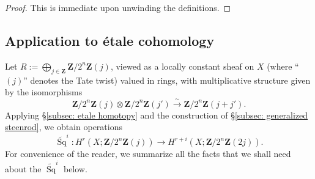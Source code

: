\documentclass[10pt, reqno]{amsart}
\numberwithin{equation}{subsection}
\newcommand{\wt}[1]{\widetilde{#1}}
\newcommand{\Z}{\mathbf{Z}}
\newcommand{\co}{\colon}
\DeclareMathOperator{\et}{\acute{e}t}
\DeclareMathOperator{\Sq}{Sq}
\DeclareMathOperator{\red}{red}
\theoremstyle{remark}
\newtheorem{remark}[thm]{Remark}
\begin{document}
\begin{proof}
This is immediate upon unwinding the definitions. 
\end{proof}

\begin{comment}
\begin{remark}
More generally, if 
\[
0 \rightarrow R/2^n R \rightarrow R/2^{n+1} R \rightarrow R/2R \rightarrow 0
\]
is short exact, then we can construct additional Steenrod operations in the following way. Given any admissible sequence $\Sq^I = \Sq^{i_1} \Sq^{i_2} \ldots$, if $i_1$ is even then we can define Steenrod operations $\wt{\Sq}^I = [2^{n-1} ] \circ \Sq^I \circ \red_2$ and $\beta_{2,2^n} \circ \Sq^I \circ \red_2$ on $H^*(X; R/2^n R)$.

If $R = \Z$ and $n>1$, then in addition to the identity map on $H (\Z/2^n\Z)$ these operations comprise the entire Steenrod algebra of stable cohomology operations with $\Z/2^n\Z$-coefficients 
\[
H^*(-;\Z/2^n \Z) \rightarrow H^*(-; \Z/2^n \Z),
\]
or in other words the spectrum maps $H (\Z/2^n\Z) \rightarrow H (\Z/2^n\Z)$. This can be proved\footnote{We thank Soren Galatius for teaching this argument to us.} by calculating $H^*(H (\Z/2^n\Z); \Z/2^n \Z)$ using the description of the Bockstein spectral sequence in \cite{Browd61} \S 5. There it is explained that for $n>1$ all terms in $E_1^* = H^*(H (\Z/2^n\Z); \Z/2\Z)$, which are indexed by admissible sequences of Steenrod squares as above, are killed by $d_1$ except the term corresponding to $\red_2$, which survives to $E_r$. This computes that  for $n>1$, the higher integral cohomology of the spectrum $H(\Z/2^n\Z)$ is all 2-torsion, coming from Bocksteins of (mod 2) Steenrod operations. Then by the universal coefficient theorem the aforementioned pairs of operations comprise the $\Z/2^n \Z$-cohomology of the spectrum $H(\Z/2^n\Z)$.
\end{remark}
\end{comment}


 \subsection{Application to \'{e}tale cohomology}
 
 Let $R := \bigoplus_{j \in \Z} \Z/2^n \Z(j)$, viewed as a locally constant sheaf on $X$ (where ``$(j)$'' denotes the Tate twist) valued in rings, with multiplicative structure given by the isomorphisms
 \[
 \Z/2^n \Z(j) \otimes \Z/2^n \Z(j') \xrightarrow{\sim}  \Z/2^n \Z(j+j').
 \]
 Applying \S \ref{subsec: etale homotopy} and the construction of \S \ref{subsec: generalized steenrod}, we obtain operations 
 \[
 \wt{\Sq}^i \co H_{\et}^r(X; \Z/2^n\Z(j)) \rightarrow H_{\et}^{r+i}(X; \Z/2^n \Z(2j)).
 \]
For convenience of the reader, we summarize all the facts that we shall need about the $ \wt{\Sq}^i$ below.
\end{document}
